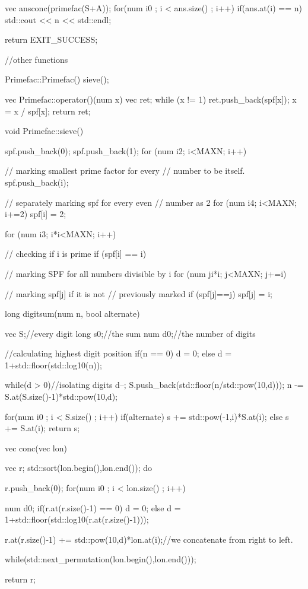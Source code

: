 \documentclass[a4paper, 11pt]{report}
\begin{document}
\begin{c++}
{{		vec ans{conc(primefac(S+A))};
		for(num i{0} ; i < ans.size() ; i++)
			if(ans.at(i) == n)
				std::cout << n << std::endl;
	}

	return EXIT_SUCCESS;
}

//other functions

Primefac::Primefac() {sieve();}

vec Primefac::operator()(num x)
{ 
    vec ret; 
    while (x != 1) 
    { 
        ret.push_back(spf[x]); 
        x = x / spf[x]; 
    } 
    return ret; 
}

void Primefac::sieve() 
{ 
    spf.push_back(0); spf.push_back(1); 
    for (num i{2}; i<MAXN; i++) 
 
        // marking smallest prime factor for every 
        // number to be itself. 
        spf.push_back(i); 
  
    // separately marking spf for every even 
    // number as 2 
    for (num i{4}; i<MAXN; i+=2) 
        spf[i] = 2; 
  
    for (num i{3}; i*i<MAXN; i++) 
    { 
        // checking if i is prime 
        if (spf[i] == i) 
        { 
            // marking SPF for all numbers divisible by i 
            for (num j{i*i}; j<MAXN; j+=i) 
  
                // marking spf[j] if it is not  
                // previously marked 
                if (spf[j]==j) 
                    spf[j] = i; 
        } 
    } 
}

long digitsum(num n, bool alternate)
{
	vec S{};//every digit
	long s{0};//the sum
	num d{0};//the number of digits

	//calculating highest digit position
	if(n == 0) d = 0;
	else d = 1+std::floor(std::log10(n));

	while(d > 0)//isolating digits
	{
		d--;
		S.push_back(std::floor(n/std::pow(10,d)));
		n -= S.at(S.size()-1)*std::pow(10,d);
	}

	for(num i{0} ; i < S.size() ; i++)
	{
		if(alternate) s += std::pow(-1,i)*S.at(i);
		else s += S.at(i);
	}
	return s;
}

vec conc(vec lon)
{
	vec r{};
	std::sort(lon.begin(),lon.end());
	do{
		r.push_back(0);
		for(num i{0} ; i < lon.size() ; i++)
		{
			num d{0};
			if(r.at(r.size()-1) == 0) d = 0;
			else d = 1+std::floor(std::log10(r.at(r.size()-1)));

			r.at(r.size()-1) += std::pow(10,d)*lon.at(i);//we concatenate from right to left.
		}
	} while(std::next_permutation(lon.begin(),lon.end()));

	return r;
}


\end{c++}
	
%
%
\end{document}
